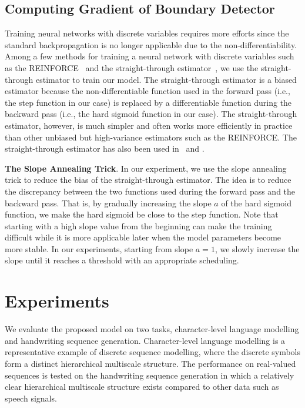 \documentclass{article} %
\begin{document}
\subsection{Computing Gradient of Boundary Detector}
Training neural networks with discrete variables requires more efforts since the standard backpropagation 
is no longer applicable due to the non-differentiability. 
Among a few methods for training a neural network with discrete variables such as the REINFORCE~\citep{williams1992simple,mnih2014neural} 
and the straight-through  estimator~\citep{hinton2012coursera,bengio2013estimating}, we use the straight-through estimator to train our model. 
The straight-through estimator is a biased estimator because the non-differentiable function used in the forward pass 
(i.e., the step function in our case) is replaced by a differentiable function during the backward pass 
(i.e., the hard sigmoid function in our case). 
The straight-through estimator, however, is much simpler and often works more efficiently in practice 
than other unbiased but high-variance estimators such as the REINFORCE. 
The straight-through estimator has also been used in~\citet{courbariaux2016binarized} and \citet{vezhnevets2016strategic}. 

\textbf{The Slope Annealing Trick}. In our experiment, we use the slope annealing trick to reduce the bias of the straight-through estimator. 
The idea is to reduce the discrepancy between the two functions used during the forward pass and the backward pass. 
That is, by gradually increasing the slope $a$ of the hard sigmoid function, we make the hard sigmoid be close to the step function. 
Note that starting with a high slope value from the beginning can make the training difficult while it is 
more applicable later when the model parameters become more stable. 
In our experiments, starting from slope $a=1$, we slowly increase the slope until it reaches a threshold with an appropriate scheduling. 


\section{Experiments}
\label{sec:experiments}
We evaluate the proposed model on two tasks, character-level language modelling and handwriting sequence generation. 
Character-level language modelling is a representative example of discrete sequence modelling, 
where the discrete symbols form a distinct hierarchical multiscale structure. 
The performance on real-valued sequences is tested on the handwriting sequence generation in which a relatively
clear hierarchical multiscale structure exists compared to other data such as speech signals. 
\end{document}
